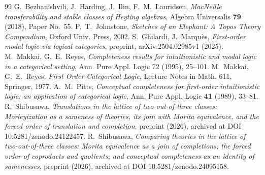 \documentclass[11pt]{amsart}
\theoremstyle{definition}
\begin{document}
\begin{thebibliography}{99}
 G.~Bezhanishvili, J.~Harding, J.~Ilin,
F.~M.~Lauridsen, \emph{MacNeille transferability and stable classes of
Heyting algebras}, Algebra Universalis \textbf{79} (2018), Paper No.~55.
 P.~T.~Johnstone, \emph{Sketches of an Elephant: A Topos
Theory Compendium}, Oxford Univ. Press, 2002.
 S.~Ghilardi, J.~Marqu\`es, \emph{First-order modal logic
via logical categories}, preprint, arXiv:2504.02985v1 (2025).
 M.~Makkai, G.~E.~Reyes, \emph{Completeness results for
intuitionistic and modal logic in a categorical setting}, Ann. Pure
Appl. Logic 72 (1995), 25--101.
 M.~Makkai, G.~E.~Reyes, \emph{First Order Categorical
Logic}, Lecture Notes in Math. 611, Springer, 1977.
 A.~M.~Pitts, \emph{Conceptual completeness for
first-order intuitionistic logic: an application of categorical logic},
Ann. Pure Appl. Logic \textbf{41} (1989), 33--81.
 R.~Shibusawa, \emph{Translations in the lattice of
two-out-of-three classes: Morleyization as a sameness of theories, its
join with Morita equivalence, and the forced order of translation and
completion}, preprint (2026), archived at DOI 10.5281/zenodo.24122457.
 R.~Shibusawa, \emph{Comparing theories in the lattice
of two-out-of-three classes: Morita equivalence as a join of completions,
the forced order of coproducts and quotients, and conceptual completeness
as an identity of samenesses}, preprint (2026), archived at DOI
10.5281/zenodo.24095158.
\end{thebibliography}
\end{document}
